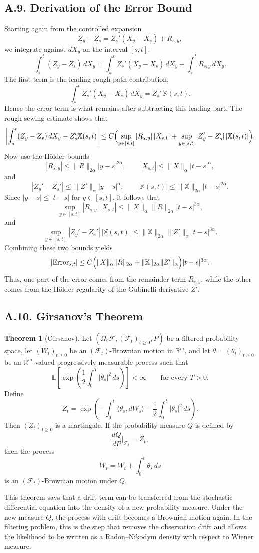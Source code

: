 \documentclass[11pt]{article}
\theoremstyle{definition}
\newtheorem{theorem}{Theorem}
\theoremstyle{remark}
\begin{document}
\subsection*{A.9. Derivation of the Error Bound}
Starting again from the controlled expansion
\[
Z_y-Z_s
=
Z_s'(X_y-X_s)+R_{s,y},
\]
we integrate against $dX_y$ on the interval $[s,t]$:
\[
\int_s^t (Z_y-Z_s)\,dX_y
=
\int_s^t Z_s'(X_y-X_s)\,dX_y
+
\int_s^t R_{s,y}\,dX_y.
\]
The first term is the leading rough path contribution,
\[
\int_s^t Z_s'(X_y-X_s)\,dX_y
=
Z_s'\,\mathbb X(s,t).
\]
Hence the error term is what remains after subtracting this leading part. The rough sewing estimate shows that
\[
\left|
\int_s^t (Z_y-Z_s)\,dX_y - Z_s'\mathbb X(s,t)
\right|
\le
C\Bigl(
\sup_{y\in[s,t]}|R_{s,y}|\,|X_{s,t}|
+
\sup_{y\in[s,t]}|Z_y'-Z_s'|\,|\mathbb X(s,t)|
\Bigr).
\]
Now use the H\"older bounds
\[
|R_{s,y}|
\le
\|R\|_{2\alpha}|y-s|^{2\alpha},
\qquad
|X_{s,t}|
\le
\|X\|_{\alpha}|t-s|^{\alpha},
\]
and
\[
|Z_y'-Z_s'|
\le
\|Z'\|_{\alpha}|y-s|^{\alpha},
\qquad
|\mathbb X(s,t)|
\le
\|\mathbb X\|_{2\alpha}|t-s|^{2\alpha}.
\]
Since $|y-s|\le |t-s|$ for $y\in[s,t]$, it follows that
\[
\sup_{y\in[s,t]}|R_{s,y}|\,|X_{s,t}|
\le
\|X\|_{\alpha}\|R\|_{2\alpha}|t-s|^{3\alpha},
\]
and
\[
\sup_{y\in[s,t]}|Z_y'-Z_s'|\,|\mathbb X(s,t)|
\le
\|\mathbb X\|_{2\alpha}\|Z'\|_{\alpha}|t-s|^{3\alpha}.
\]
Combining these two bounds yields
\[
|\mathrm{Error}_{s,t}|
\le
C\Bigl(
\|X\|_{\alpha}\|R\|_{2\alpha}
+
\|\mathbb X\|_{2\alpha}\|Z'\|_{\alpha}
\Bigr)|t-s|^{3\alpha}.
\]
Thus, one part of the error comes from the remainder term $R_{s,y}$, while the other comes from the H\"older regularity of the Gubinelli derivative $Z'$.

\subsection*{A.10. Girsanov's Theorem}
\begin{theorem}[Girsanov]
Let $(\Omega,\mathcal F,(\mathcal F_t)_{t\ge 0},P)$ be a filtered probability space, let $(W_t)_{t\ge 0}$ be an $(\mathcal F_t)$-Brownian motion in $\mathbb R^m$, and let $\theta=(\theta_t)_{t\ge 0}$ be an $\mathbb R^m$-valued progressively measurable process such that
\[
\mathbb E\left[\exp\left(\frac12\int_0^T |\theta_s|^2\,ds\right)\right]<\infty
\qquad \text{for every } T>0.
\]
Define
\[
Z_t
=
\exp\left(
-\int_0^t \langle \theta_s,dW_s\rangle
-\frac12\int_0^t |\theta_s|^2\,ds
\right).
\]
Then $(Z_t)_{t\ge 0}$ is a martingale. If the probability measure $Q$ is defined by
\[
\frac{dQ}{dP}\Big|_{\mathcal F_t}=Z_t,
\]
then the process
\[
\widetilde W_t
=
W_t+\int_0^t \theta_s\,ds
\]
is an $(\mathcal F_t)$-Brownian motion under $Q$.
\end{theorem}

This theorem says that a drift term can be transferred from the stochastic differential equation into the density of a new probability measure. Under the new measure $Q$, the process with drift becomes a Brownian motion again. In the filtering problem, this is the step that removes the observation drift and allows the likelihood to be written as a Radon--Nikodym density with respect to Wiener measure.
\end{document}
